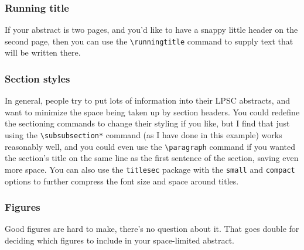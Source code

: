 \documentclass[twoside]{article}
\begin{document}
\subsubsection*{Running title}

If your abstract is two pages, and you'd like to have a snappy little
header on the second page, then you can use the \verb=\runningtitle=
command to supply text that will be written there.

\subsubsection*{Section styles}

In general, people try to put lots of information into their LPSC
abstracts, and want to minimize the space being taken up by section
headers.  You could redefine the sectioning commands to change their
styling if you like, but I find that just using the \verb=\subsubsection*=
command (as I have done in this example) works reasonably well, and
you could even use the \verb=\paragraph= command if you wanted the
section's title on the same line as the first sentence of the
section, saving even more space.  You can also use the \verb=titlesec=
package with the \verb=small= and \verb=compact= options to further
compress the font size and space around titles.


\subsubsection*{Figures}

Good figures are hard to make, there's no question about it.  That
goes double for deciding which figures to include in your 
space-limited abstract.
\end{document}
